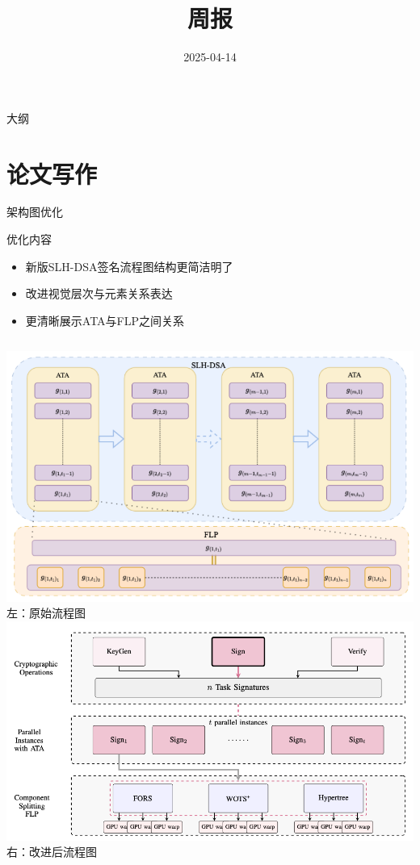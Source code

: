 \documentclass{beamer}
\title{\LARGE{周报}}
\subtitle{}
\author{}
\date{2025-04-14}
\begin{document}
\begin{frame}
  \titlepage
\end{frame}

\begin{frame}{大纲}
  \tableofcontents
\end{frame}

\section{论文写作}
\begin{frame}{架构图优化}
  \begin{block}{优化内容}
    \begin{itemize}
      \item 新版SLH-DSA签名流程图结构更简洁明了
      \item 改进视觉层次与元素关系表达
      \item 更清晰展示ATA与FLP之间关系
    \end{itemize}
  \end{block}
  \begin{columns}[c]
    \centering
    \includegraphics[width=\linewidth]{fig/arch_old.png}\\
    \footnotesize{左：原始流程图}
    \centering
    \includegraphics[width=\linewidth]{fig/arch.png}\\
    \footnotesize{右：改进后流程图}
  \end{columns}
\end{frame}
\end{document}
